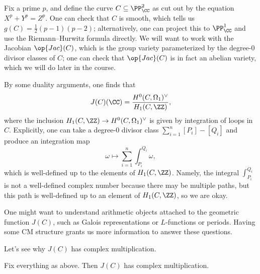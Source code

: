 \documentclass[../notes.tex]{subfiles}
\begin{document}
Fix a prime $p$, and define the curve $C\subseteq\PP^2_\CC$ as cut out by the equation $X^p+Y^p=Z^p$. One can check that $C$ is smooth, which tells us $g(C)=\frac12(p-1)(p-2)$; alternatively, one can project this to $\PP^1_\CC$ and use the Riemann--Hurwitz formula directly. We will want to work with the Jacobian $\op{Jac}(C)$, which is the group variety parameterized by the degree-$0$ divisor classes of $C$; one can check that $\op{Jac}(C)$ is in fact an abelian variety, which we will do later in the course.
\begin{remark}
	By some duality arguments, one finds that
	\[J(C)(\CC)=\frac{H^0(C,\Omega_1)^\lor}{H_1(C,\ZZ)},\]
	where the inclusion $H_1(C,\ZZ)\to H^0(C,\Omega_1)^\lor$ is given by integration of loops in $C$. Explicitly, one can take a degree-$0$ divisor class $\sum_{i=1}^n[P_i]-[Q_i]$ and produce an integration map
	\[\omega\mapsto\sum_{i=1}^n\int_{P_i}^{Q_i}\omega,\]
	which is well-defined up to the elements of $H_1(C,\ZZ)$. Namely, the integral $\int_{P_i}^{Q_i}$ is not a well-defined complex number because there may be multiple paths, but this path is well-defined up to an element of $H_1(C,\ZZ)$, so we are okay.
\end{remark}
\begin{remark}
	One might want to understand arithmetic objects attached to the geometric function $J(C)$, such as Galois representations or $L$-functions or periods. Having some CM structure grants us more information to answer these questions.
\end{remark}
Let's see why $J(C)$ has complex multiplication.
\begin{theorem}
	Fix everything as above. Then $J(C)$ has complex multiplication.
\end{theorem}
\end{document}
